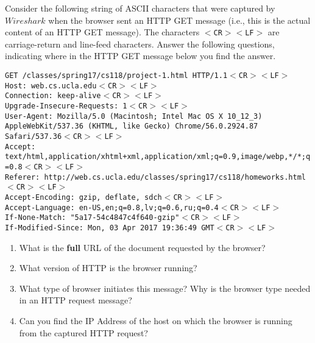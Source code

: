 \documentclass{report}
\begin{document}
\mktitle

\begin{problem}

\newcommand{\ENDL}{$<$CR$>$$<$LF$>$}

Consider the following string of ASCII characters that were captured by $Wireshark$ when the browser sent an HTTP GET message (i.e., this is the actual content of an HTTP GET message). The characters \texttt{\ENDL{}} are carriage-return and line-feed characters. Answer the following questions, indicating where in the HTTP GET message below you find the answer.\\

\begin{raggedright}
\texttt{GET /classes/spring17/cs118/project-1.html HTTP/1.1\ENDL\\
Host: web.cs.ucla.edu\ENDL\\
Connection: keep-alive\ENDL\\
Upgrade-Insecure-Requests: 1\ENDL\\
User-Agent: Mozilla/5.0 (Macintosh; Intel Mac OS X 10\_12\_3) AppleWebKit/537.36 (KHTML, like Gecko) Chrome/56.0.2924.87 Safari/537.36\ENDL\\
Accept: text/html,application/xhtml+xml,application/xml;q=0.9,image/webp,*/*;q=0.8\ENDL\\
Referer: http://web.cs.ucla.edu/classes/spring17/cs118/homeworks.html\ENDL\\
Accept-Encoding: gzip, deflate, sdch\ENDL\\
Accept-Language: en-US,en;q=0.8,lv;q=0.6,ru;q=0.4\ENDL\\
If-None-Match: "5a17-54c4847c4f640-gzip"\ENDL\\
If-Modified-Since: Mon, 03 Apr 2017 19:36:49 GMT\ENDL\\
}
\end{raggedright}

\begin{enumerate}
\item What is the \textbf{full} URL of the document requested by the browser?
\item What version of HTTP is the browser running?
\item What type of browser initiates this message? Why is the browser type needed in an HTTP  request message?
\item Can you find the IP Address of the host on which the browser is running from the captured HTTP request?
\end{enumerate}


\end{problem}
\end{document}
